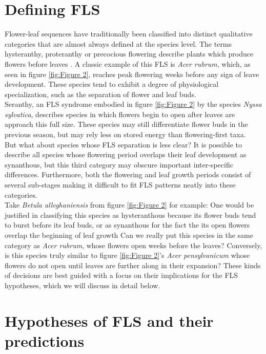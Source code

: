 \documentclass[12pt]{article}\usepackage[]{graphicx}\usepackage[]{color}
\begin{document}
\section*{Defining FLS}
\indent\indent Flower-leaf sequences have traditionally been classified into distinct qualitative categories that are almost always defined at the species level. The terms hysteranthy, proteranthy or precocious flowering describe plants which produce flowers before leaves \citep{}. A classic example of this FLS is \textit{Acer rubrum}, which, as seen in figure \ref{fig:Figure 2}, reaches peak flowering weeks before any sign of leave development. These species tend to exhibit a degree of physiological specialization, such as the separation of flower and leaf buds. \\
\indent Seranthy, an FLS syndrome embodied in figure \ref{fig:Figure 2} by the species \textit{Nyssa sylvatica}, describes species in which flowers begin to open after leaves are approach this full size. These species may still differentiate flower buds in the previous season, but may rely less on stored energy than flowering-first taxa.\\
\indent But what about species whose FLS separation is less clear? It is possible to describe all species whose flowering period overlaps their leaf development as synanthous, but this third category may obscure important inter-specific differences. Furthermore, both the flowering and leaf growth periods consist of several sub-stages making it difficult to fit FLS patterns neatly into these categories.\\
 \indent Take \textit{Betula alleghaniensis} from figure \ref{fig:Figure 2} for example: One would be justified in classifying this species as hysteranthous because its flower buds tend to burst before its leaf buds, or as synanthous for the fact the its open flowers overlap the beginning of leaf growth Can we really put this species in the same category as \textit{Acer rubrum}, whose flowers open weeks before the leaves? Conversely, is this species truly similar to figure \ref{fig:Figure 2}'s \textit{Acer pensylvanicum} whose flowers do not open until leaves are further along in their expansion?  These kinds of decisions are best guided with a focus on their implications for the FLS hypotheses, which we will discuss in detail below. 
\section*{Hypotheses of FLS and their predictions}
\end{document}

